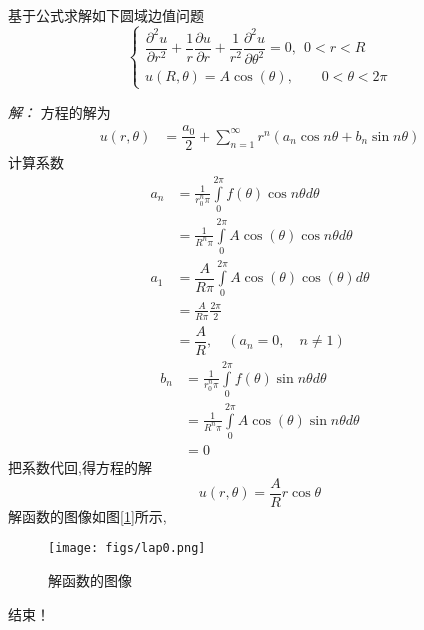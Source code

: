 ~~\\ 

\begin{example}
	基于公式求解如下圆域边值问题
	$$  \displaystyle  \left\{ 
	\begin{array}{cc}
		\displaystyle {	\dfrac{\partial^2 u }{\partial r^2 } +\dfrac{1}{r } \dfrac{\partial u }{\partial r } +
		\dfrac{1}{r^2 } \dfrac{\partial ^2 u }{\partial \theta ^2
		} } =0, ~~ 0<r<R\\
		u(R,\theta )=A\cos(\theta),~~~~~~~~~ 0<\theta <2\pi 
	\end{array}
	\right. $$
\end{example}
\emph{解：}
	方程的解为
	$$\begin{aligned}
		u(r, \theta) &= \dfrac{a_0}{2}  +\sum\limits_{n=1}^{\infty }r^n (a_n  \cos n\theta +b_n \sin n \theta )
	\end{aligned}$$
	计算系数 
	$$\begin{aligned}
	a_n & = \frac{1}{r_0^n \pi  } \int\limits_{0}^{2\pi} f(\theta) \cos n \theta d\theta \\
	& = \frac{1}{R^n \pi  } \int\limits_{0}^{2\pi} A\cos(\theta) \cos n \theta d\theta \\
	a_1& = \dfrac{A}{R\pi }  \int\limits_{0}^{2\pi} A\cos (\theta) \cos (\theta) d\theta  \\
	& = \frac{A}{R \pi } \frac{2\pi}{2} \\
	& = \dfrac{A}{R}, \quad (a_n =0, \quad n\ne 1)
 \end{aligned} $$
 $$\begin{aligned}
	b_n & = \frac{1}{r_0^n \pi  } \int\limits_{0}^{2\pi} f(\theta) \sin n \theta d\theta \\
	& = \frac{1}{R^n \pi  } \int\limits_{0}^{2\pi} A\cos(\theta) \sin n \theta d\theta \\
	&= 0
 \end{aligned} $$
 把系数代回,得方程的解
 $$ u(r, \theta) = \dfrac{A}{R} r \cos \theta $$
 解函数的图像如图[\ref{fig:lap0.png}]所示,
   \begin{figure}[htbp]
	\centering
	\texttt{[image: figs/lap0.png]}
	\caption{解函数的图像}
	\label{fig:lap0.png}
  \end{figure}
 结束！

